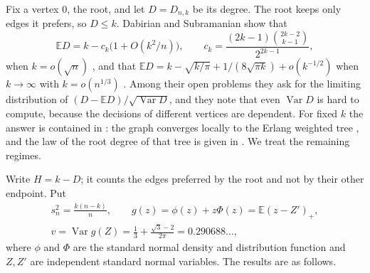\documentclass[11pt]{amsart}
\theoremstyle{remark}
\numberwithin{equation}{section}
\newcommand{\E}{\mathbb E}
\newcommand{\1}{\mathbf 1}
\newcommand{\Var}{\operatorname{Var}}
\begin{document}
Fix a vertex $0$, the root, and let $D=D_{n,k}$ be its degree. The root keeps only edges it prefers, so $D\le k$. Dabirian and Subramanian show that
\[
\E D=k-c_k\bigl(1+O(k^2/n)\bigr),\qquad c_k=\frac{(2k-1)\binom{2k-2}{k-1}}{2^{2k-1}},
\]
when $k=o(\sqrt n)$ \cite[Theorem~7]{DS}, and that $\E D=k-\sqrt{k/\pi}+1/(8\sqrt{\pi k})+o(k^{-1/2})$ when $k\to\infty$ with $k=o(n^{1/3})$ \cite[Theorem~8]{DS}. Among their open problems \cite[Section~1.1]{DS} they ask for the limiting distribution of $(D-\E D)/\sqrt{\Var D}$, and they note that even $\Var D$ is hard to compute, because the decisions of different vertices are dependent. For fixed $k$ the answer is contained in \cite{EWT}: the graph converges locally to the Erlang weighted tree \cite[Theorem~2.1]{EWT}, and the law of the root degree of that tree is given in \cite[Theorem~5.1]{EWT}. We treat the remaining regimes.

Write $H=k-D$; it counts the edges preferred by the root and not by their other endpoint. Put
\begin{gather*}
s_n^2=\frac{k(n-k)}{n},\qquad g(z)=\phi(z)+z\Phi(z)=\E(z-Z')_+,\\
v=\Var g(Z)=\frac13+\frac{\sqrt3-2}{2\pi}=0.290688\ldots,
\end{gather*}
where $\phi$ and $\Phi$ are the standard normal density and distribution function and $Z,Z'$ are independent standard normal variables. The results are as follows.
\end{document}
